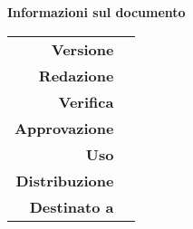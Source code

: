\begin{center}
\textbf{Informazioni sul documento} \\ \vspace{0.5em}
\small
\begin{tabular}{r|l}
	\textbf{Versione}	& 	\version\\
	\textbf{Redazione}	&\editorialstaff\\
	\textbf{Verifica}	&\teststaff\\
	\textbf{Approvazione}	&\approvalstaff\\
	\textbf{Uso}	&\use\\
	\textbf{Distribuzione} 		&  	\gruppo\\
	\textbf{Destinato a} 			& 	\addressedto
\end{tabular}
\end{center}
\normalsize